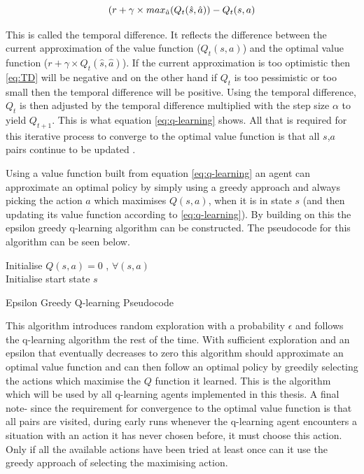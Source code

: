 \begin{equation}\label{eq:TD}
(r + \gamma \times max_{\hat{a}}(Q_t(\hat{s},\hat{a})) - Q_t(s,a)\\
\end{equation}

This is called the temporal difference. It reflects the difference between the current approximation of the value function ($Q_t(s,a)$) and the optimal value function ($r + \gamma \times Q_t(\hat{s},\hat{a})$). If the current approximation is too optimistic then \ref{eq:TD} will be negative and on the other hand if $Q_t$ is too pessimistic or too small then the temporal difference will be positive. Using the temporal difference, $Q_t$ is then adjusted by the temporal difference multiplied with the step size $\alpha$ to yield $Q_{t+1}$. This is what equation \ref{eq:q-learning} shows. All that is required for this iterative process to converge to the optimal value function is that all $s$,$a$ pairs continue to be updated \cite{sutton_barto}.

Using a value function built from equation \ref{eq:q-learning} an agent can approximate an optimal policy by simply using a greedy approach and always picking the action $a$ which maximises $Q(s,a)$, when it is in state $s$ (and then updating its value function according to \ref{eq:q-learning}). By building on this the epsilon greedy q-learning algorithm can be constructed. The pseudocode for this algorithm can be seen below.
\begin{algorithm}[h]
Initialise $Q(s,a) = 0$ , $\forall (s,a)$\\
Initialise start state $s$\\
\caption{Epsilon Greedy Q-learning Pseudocode}
\label{alg:q-learning}
\end{algorithm}

This algorithm introduces random exploration with a probability $\epsilon$ and follows the q-learning algorithm the rest of the time. With sufficient exploration and an epsilon that eventually decreases to zero this algorithm should approximate an optimal value function and can then follow an optimal policy by greedily selecting the actions which maximise the $Q$ function it learned. This is the algorithm which will be used by all q-learning agents implemented in this thesis. A final note- since the requirement for convergence to the optimal value function is that all pairs are visited, during early runs whenever the q-learning agent encounters a situation with an action it has never chosen before, it must choose this action. Only if all the available actions have been tried at least once can it use the greedy approach of selecting the maximising action.


